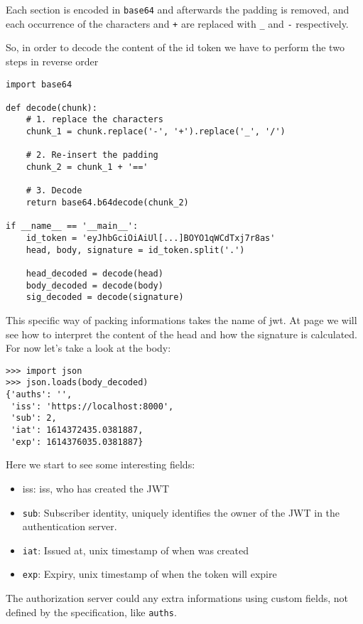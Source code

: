 Each section is encoded in \texttt{base64} and afterwards the padding is
removed, and each occurrence of the characters \texttt{\/} and \texttt{+}  are
replaced with \texttt{\_} and \texttt{-} respectively.

So, in order to decode the content of the id token we have to perform the two steps in reverse order

\begin{lstlisting}[label=lst:decode-jwt, caption=Decode JWT chunks]
import base64

def decode(chunk):
    # 1. replace the characters
    chunk_1 = chunk.replace('-', '+').replace('_', '/')

    # 2. Re-insert the padding
    chunk_2 = chunk_1 + '=='

    # 3. Decode
    return base64.b64decode(chunk_2)

if __name__ == '__main__':
    id_token = 'eyJhbGciOiAiUl[...]BOYO1qWCdTxj7r8as'
    head, body, signature = id_token.split('.')

    head_decoded = decode(head)
    body_decoded = decode(body)
    sig_decoded = decode(signature)
\end{lstlisting}


This specific way of packing informations takes the name of \acl{jwt}.
At page \pageref{jwt} we will see how to interpret the content of the head and how the signature is calculated.
For now let's take a look at the body:

\begin{lstlisting}
>>> import json
>>> json.loads(body_decoded)
{'auths': '',
 'iss': 'https://localhost:8000',
 'sub': 2,
 'iat': 1614372435.0381887,
 'exp': 1614376035.0381887}
\end{lstlisting}

Here we start to see some interesting fields:
\begin{itemize}
    \item \acs{iss}: \acl{iss}, who has created the JWT
    \item \texttt{sub}: Subscriber identity, uniquely identifies the owner of
        the JWT in the authentication server.
    \item \texttt{iat}: Issued at, unix timestamp of when was created
    \item \texttt{exp}: Expiry, unix timestamp of when the token will expire
\end{itemize}
The authorization server could any extra informations using custom fields, not
defined by the specification, like \texttt{auths}.

